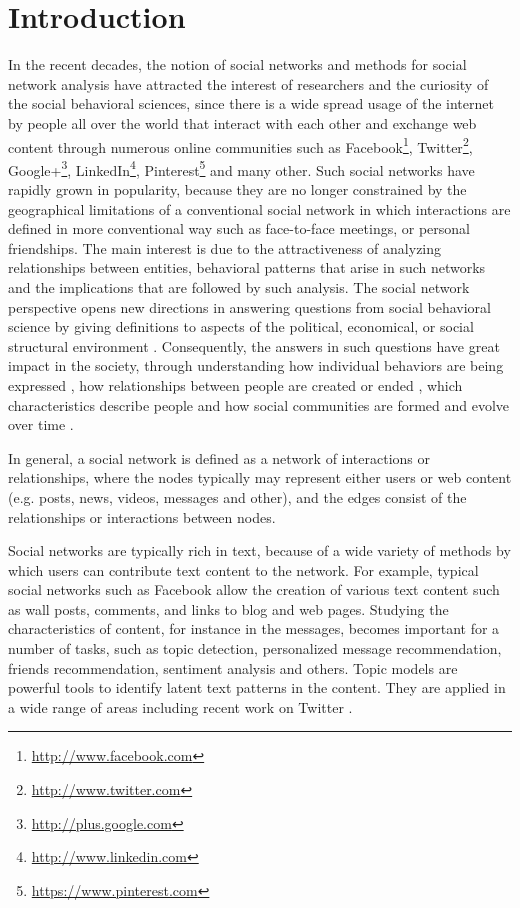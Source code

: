 \section{Introduction}


In the recent decades, the notion of social networks and methods for social network analysis have attracted the interest of researchers and the curiosity of the social behavioral sciences, since there is a wide spread usage of the internet by people all over the world that interact with each other and exchange web content through numerous online communities such as Facebook\footnote{\url{http://www.facebook.com}}, Twitter\footnote{\url{http://www.twitter.com}}, Google+\footnote{\url{http://plus.google.com}}, LinkedIn\footnote{\url{http://www.linkedin.com}}, Pinterest\footnote{\url{https://www.pinterest.com}} and many other. Such social networks have rapidly grown
in popularity, because they are no longer constrained by the geographical limitations of a conventional social network in which interactions are defined in more conventional way such as face-to-face meetings, or personal friendships. The main interest is due to the attractiveness of analyzing relationships between entities, behavioral patterns that arise in such networks and the implications that are followed by such analysis. The social network perspective opens new directions in answering questions from social behavioral science by giving definitions to aspects of the political, economical, or social structural environment \cite{sna}. Consequently, the answers in such questions have great impact in the society, through understanding how individual behaviors are being expressed \cite{ba}, how relationships between people are created or ended \cite{friend_pred}, which characteristics describe people \cite{am2} and how social communities are formed \cite{com_det} and evolve over time \cite{com_ev1}. 


In general, a social network is defined as a network of interactions or relationships, where the nodes typically may represent either users or web content (e.g. posts, news, videos, messages and other), and the edges consist of the relationships or interactions between nodes. %
 

Social networks are typically rich in text, because of a wide variety of methods by which users can contribute text content to the network. For example,
typical social networks such as Facebook allow the creation of various text content such as wall posts, comments, and links to blog and web pages. Studying the characteristics of content, for instance in the messages, becomes important for a number of tasks, such as topic detection, personalized message recommendation, friends recommendation, sentiment analysis and others. Topic models \cite{blei2} are powerful tools to identify latent text patterns in the content. They are applied in a wide range of areas including recent work on Twitter \cite{microblogs}.

